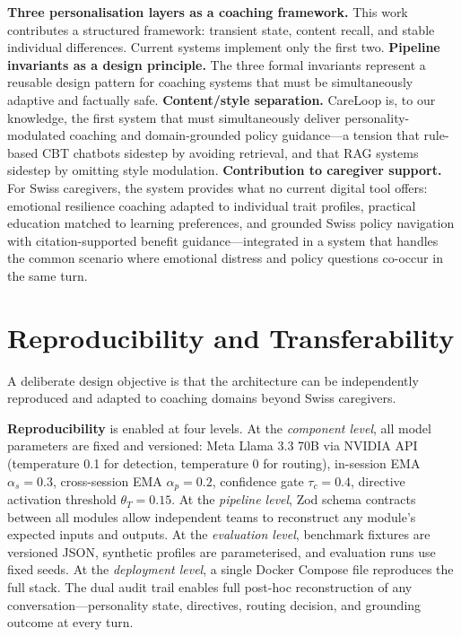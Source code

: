 \documentclass[10pt,a4paper]{report}
\begin{document}
\textbf{Three personalisation layers as a coaching framework.} This work contributes a structured framework: transient state, content recall, and stable individual differences. Current systems implement only the first two. \textbf{Pipeline invariants as a design principle.} The three formal invariants represent a reusable design pattern for coaching systems that must be simultaneously adaptive and factually safe. \textbf{Content/style separation.} CareLoop is, to our knowledge, the first system that must simultaneously deliver personality-modulated coaching and domain-grounded policy guidance---a tension that rule-based CBT chatbots sidestep by avoiding retrieval, and that RAG systems sidestep by omitting style modulation. \textbf{Contribution to caregiver support.} For Swiss caregivers, the system provides what no current digital tool offers: emotional resilience coaching adapted to individual trait profiles, practical education matched to learning preferences, and grounded Swiss policy navigation with citation-supported benefit guidance---integrated in a system that handles the common scenario where emotional distress and policy questions co-occur in the same turn.

\section{Reproducibility and Transferability}

A deliberate design objective is that the architecture can be independently reproduced and adapted to coaching domains beyond Swiss caregivers.

\textbf{Reproducibility} is enabled at four levels. At the \emph{component level}, all model parameters are fixed and versioned: Meta Llama 3.3 70B via NVIDIA API (temperature 0.1 for detection, temperature 0 for routing), in-session EMA $\alpha_s = 0.3$, cross-session EMA $\alpha_p = 0.2$, confidence gate $\tau_c = 0.4$, directive activation threshold $\theta_T = 0.15$. At the \emph{pipeline level}, Zod schema contracts between all modules allow independent teams to reconstruct any module's expected inputs and outputs. At the \emph{evaluation level}, benchmark fixtures are versioned JSON, synthetic profiles are parameterised, and evaluation runs use fixed seeds. At the \emph{deployment level}, a single Docker Compose file reproduces the full stack. The dual audit trail enables full post-hoc reconstruction of any conversation---personality state, directives, routing decision, and grounding outcome at every turn.
\end{document}
